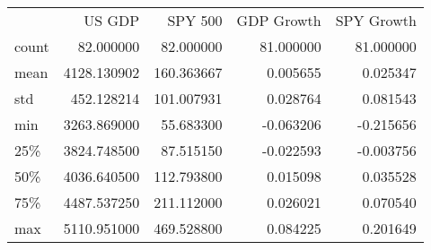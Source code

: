\begin{tabular}{lrrrr}
 & US GDP & SPY 500 & GDP Growth & SPY Growth \\
count & 82.000000 & 82.000000 & 81.000000 & 81.000000 \\
mean & 4128.130902 & 160.363667 & 0.005655 & 0.025347 \\
std & 452.128214 & 101.007931 & 0.028764 & 0.081543 \\
min & 3263.869000 & 55.683300 & -0.063206 & -0.215656 \\
25\% & 3824.748500 & 87.515150 & -0.022593 & -0.003756 \\
50\% & 4036.640500 & 112.793800 & 0.015098 & 0.035528 \\
75\% & 4487.537250 & 211.112000 & 0.026021 & 0.070540 \\
max & 5110.951000 & 469.528800 & 0.084225 & 0.201649 \\
\end{tabular}
